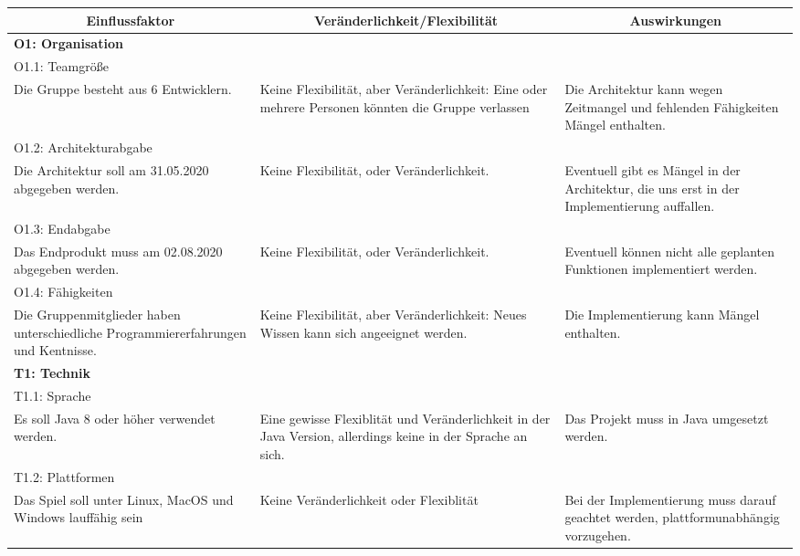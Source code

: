 \documentclass[fontsize=12pt,paper=a4,twoside]{scrartcl}
\begin{document}
\begin{longtable}[c]{|p{5cm}|p{5cm}|p{5cm}|}
\hline
\multicolumn{1}{|c|}{\textbf{Einflussfaktor}} & \multicolumn{1}{c|}{\textbf{Veränderlichkeit/Flexibilität}} & \multicolumn{1}{c|}{\textbf{Auswirkungen}}  \\ \hline
\endhead
\multicolumn{3}{|l|}{{\textbf{O1: Organisation}}} 
\\ \hline
\multicolumn{3}{|l|}{{O1.1: Teamgröße}} 
\\ \hline
Die Gruppe besteht aus 6 Entwicklern. & Keine Flexibilität, aber Veränderlichkeit: Eine oder mehrere Personen könnten die Gruppe verlassen      &  Die Architektur kann wegen Zeitmangel und fehlenden Fähigkeiten Mängel enthalten.
\\ \hline 
\multicolumn{3}{|l|}{{O1.2: Architekturabgabe}} 
\\ \hline
Die Architektur soll am 31.05.2020 abgegeben werden. & Keine Flexibilität, oder Veränderlichkeit.  & Eventuell gibt es Mängel in der Architektur, die uns erst in der Implementierung auffallen. 
\\ \hline             
\multicolumn{3}{|l|}{{O1.3: Endabgabe}} 
\\ \hline
Das Endprodukt muss am 02.08.2020 abgegeben werden. & Keine Flexibilität, oder Veränderlichkeit.   &  Eventuell können nicht alle geplanten Funktionen implementiert werden.
\\ \hline
\multicolumn{3}{|l|}{{O1.4: Fähigkeiten}} 
\\ \hline
Die Gruppenmitglieder haben unterschiedliche Programmiererfahrungen und Kentnisse. & Keine Flexibilität, aber Veränderlichkeit: Neues Wissen kann sich angeeignet werden.  & Die Implementierung kann Mängel enthalten. 
\\ \hline     
\multicolumn{3}{|l|}{{\textbf{T1: Technik}}} 
\\ \hline 
\multicolumn{3}{|l|}{{T1.1: Sprache}} 
\\ \hline
Es soll Java 8 oder höher verwendet werden. & Eine gewisse Flexiblität und Veränderlichkeit in der Java Version, allerdings keine in der Sprache an sich.  & Das Projekt muss in Java umgesetzt werden. 
\\ \hline                 
\multicolumn{3}{|l|}{{T1.2: Plattformen}} 
\\ \hline
Das Spiel soll unter Linux, MacOS und Windows lauffähig sein & Keine Veränderlichkeit oder Flexiblität  & Bei der Implementierung muss darauf geachtet werden, plattformunabhängig vorzugehen. 
\\ \hline

\end{longtable}
\end{document}
